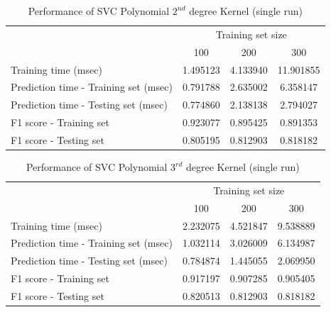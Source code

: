 \documentclass{article}
\begin{document}
	\begin{table}[h]
		\centering
		\begin{tabular}{l|ccc}
			\toprule
			{} & \multicolumn{3}{c}{Training set size} \\
			{} &       100 &       200 &        300 \\
			\midrule
			Training time (msec)                  &  1.495123 &  4.133940 &  11.901855 \\
			Prediction time - Training set (msec) &  0.791788 &  2.635002 &   6.358147 \\
			Prediction time - Testing set (msec)  &  0.774860 &  2.138138 &   2.794027 \\
			F1 score - Training set               &  0.923077 &  0.895425 &   0.891353 \\
			F1 score - Testing set                &  0.805195 &  0.812903 &   0.818182 \\
			\bottomrule
		\end{tabular}
		\caption{Performance of SVC Polynomial $2^{nd}$ degree Kernel (single run)}
		\label{tab:svc_poly_1}
	\end{table}
	
	\begin{table}[!ht]
		\centering
		\begin{tabular}{l|ccc}
			\toprule
			{} & \multicolumn{3}{c}{Training set size} \\
			{} &       100 &       200 &       300 \\
			\midrule
			Training time (msec)                  &  2.232075 &  4.521847 &  9.538889 \\
			Prediction time - Training set (msec) &  1.032114 &  3.026009 &  6.134987 \\
			Prediction time - Testing set (msec)  &  0.784874 &  1.445055 &  2.069950 \\
			F1 score - Training set               &  0.917197 &  0.907285 &  0.905405 \\
			F1 score - Testing set                &  0.820513 &  0.812903 &  0.818182 \\
		\end{tabular}
		\caption{Performance of SVC Polynomial $3^{rd}$ degree Kernel (single run)}
		\label{tab:svc_poly_3_degree_1}
	\end{table}
	
\end{document}
